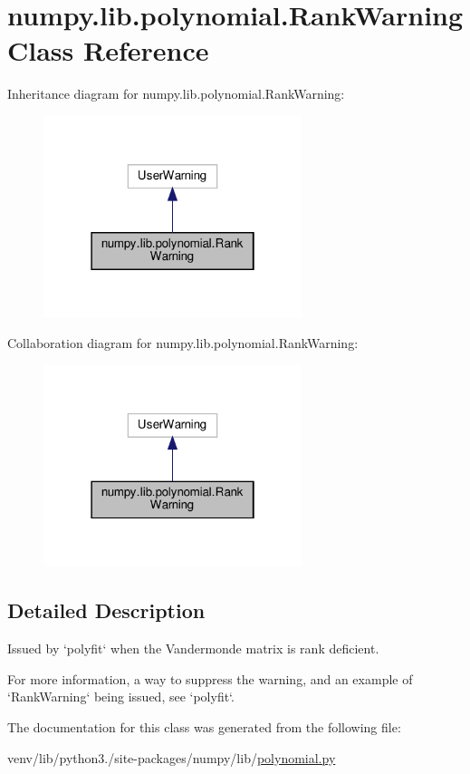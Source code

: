 \hypertarget{classnumpy_1_1lib_1_1polynomial_1_1RankWarning}{}\section{numpy.\+lib.\+polynomial.\+Rank\+Warning Class Reference}
\label{classnumpy_1_1lib_1_1polynomial_1_1RankWarning}


Inheritance diagram for numpy.\+lib.\+polynomial.\+Rank\+Warning\+:
\nopagebreak
\begin{figure}[H]
\begin{center}
\leavevmode
\includegraphics[width=214pt]{classnumpy_1_1lib_1_1polynomial_1_1RankWarning__inherit__graph}
\end{center}
\end{figure}


Collaboration diagram for numpy.\+lib.\+polynomial.\+Rank\+Warning\+:
\nopagebreak
\begin{figure}[H]
\begin{center}
\leavevmode
\includegraphics[width=214pt]{classnumpy_1_1lib_1_1polynomial_1_1RankWarning__coll__graph}
\end{center}
\end{figure}


\subsection{Detailed Description}
\begin{DoxyVerb}Issued by `polyfit` when the Vandermonde matrix is rank deficient.

For more information, a way to suppress the warning, and an example of
`RankWarning` being issued, see `polyfit`.\end{DoxyVerb}
 

The documentation for this class was generated from the following file\+:\begin{DoxyCompactItemize}
\item 
venv/lib/python3./site-\/packages/numpy/lib/\hyperlink{lib_2polynomial_8py}{polynomial.\+py}\end{DoxyCompactItemize}

